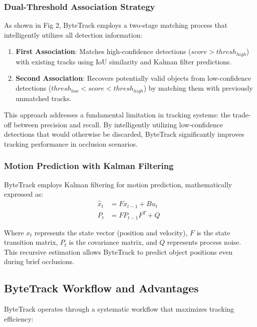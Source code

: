 \documentclass[11pt]{article}
\begin{document}
\subsubsection{Dual-Threshold Association Strategy}
As shown in Fig 2, ByteTrack employs a two-stage matching process that intelligently utilizes all detection information:

\begin{enumerate}
    \item \textbf{First Association}: Matches high-confidence detections ($score > thresh_{high}$) with existing tracks using IoU similarity and Kalman filter predictions.
    \item \textbf{Second Association}: Recovers potentially valid objects from low-confidence detections ($thresh_{low} < score < thresh_{high}$) by matching them with previously unmatched tracks.
\end{enumerate}

This approach addresses a fundamental limitation in tracking systems: the trade-off between precision and recall. By intelligently utilizing low-confidence detections that would otherwise be discarded, ByteTrack significantly improves tracking performance in occlusion scenarios.

\subsubsection{Motion Prediction with Kalman Filtering}
ByteTrack employs Kalman filtering for motion prediction, mathematically expressed as:
\begin{align}
\hat{x}_t &= Fx_{t-1} + Bu_t \\
P_t &= FP_{t-1}F^T + Q
\end{align}

Where $x_t$ represents the state vector (position and velocity), $F$ is the state transition matrix, $P_t$ is the covariance matrix, and $Q$ represents process noise. This recursive estimation allows ByteTrack to predict object positions even during brief occlusions.

\subsection{ByteTrack Workflow and Advantages}

ByteTrack operates through a systematic workflow that maximizes tracking efficiency:
\end{document}
